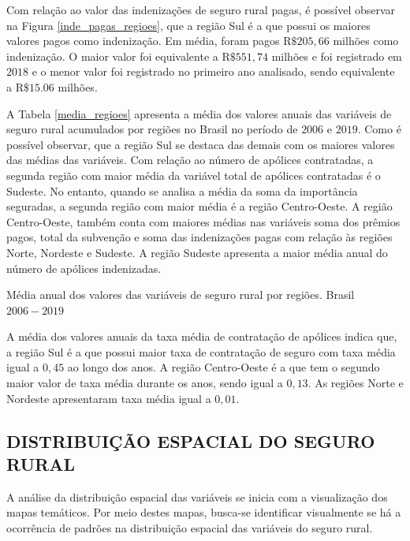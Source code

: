 Com relação ao valor das indenizações de seguro rural pagas, é possível observar na Figura \ref{inde_pagas_regioes}, que a região Sul é a que possui os maiores valores pagos como indenização. Em média, foram pagos R$\$205,66$ milhões como indenização. O maior valor foi equivalente a R$\$551,74$ milhões e foi registrado em $2018$ e o menor valor foi registrado no primeiro ano analisado, sendo equivalente a R$\$15.06$ milhões. 

A Tabela \ref{media_regioes} apresenta a média dos valores anuais das variáveis de seguro rural acumulados por regiões no Brasil no período de $2006$ e $2019$. Como é possível observar, que a região Sul se destaca das demais com os maiores valores das médias das variáveis. Com relação ao número de apólices contratadas, a segunda região com maior média da variável total de apólices contratadas é o Sudeste. No entanto, quando se analisa a média da soma da importância seguradas, a segunda região com maior média é a região Centro-Oeste. A região Centro-Oeste, também conta com maiores médias nas variáveis soma dos prêmios pagos, total da subvenção e soma das indenizações pagas com relação às regiões Norte, Nordeste e Sudeste. A região Sudeste apresenta a maior média anual do número de apólices indenizadas. 



\begin{small}
\begin{table}[H]
\caption{Média anual dos valores das variáveis de seguro rural por regiões. Brasil $2006-2019$}\label{media_regioes}

\end{table}
\end{small}

A média dos valores anuais da taxa média de contratação de apólices indica que, a região Sul é a que possui maior taxa de contratação de seguro com taxa média igual a $0,45$ ao longo dos anos. A região Centro-Oeste é a que tem o segundo maior valor de taxa média durante os anos, sendo igual a $0,13$. As regiões Norte e Nordeste apresentaram taxa média igual a $0,01$.

\subsection{DISTRIBUIÇÃO ESPACIAL DO SEGURO RURAL}

A análise da distribuição espacial das variáveis se inicia com a visualização dos mapas temáticos. Por meio destes mapas, busca-se identificar visualmente se há a ocorrência de padrões na distribuição espacial das variáveis do seguro rural.

